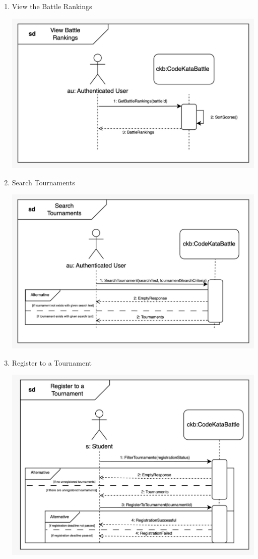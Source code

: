 \begin{enumerate}
    \newpage
    \item View the Battle Rankings
    \begin{center}
            \includegraphics[scale=0.2]{Images/sequence_diagrams/SD-view_battle_rankings.jpeg}
    \end{center}
    \item Search Tournaments
    \begin{center}
            \includegraphics[scale=0.2]{Images/sequence_diagrams/SD-search_tournaments.jpeg}
    \end{center}
    \newpage
    \item Register to a Tournament
    \begin{center}
            \includegraphics[scale=0.2]{Images/sequence_diagrams/SD-register_to_tournament.jpeg}

\end{center}
\end{enumerate}

